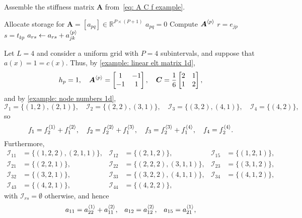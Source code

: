 \begin{algorithm}
\caption{Assemble the stiffness matrix $\boldsymbol{A}$
from~\eqref{eq: A C f example}.}
\label{alg: assemble A piecewise linear}
\begin{algorithmic}
\State Allocate storage for
$\boldsymbol{A}=[a_{pq}]\in\mathbb{R}^{P\times(P+1)}$
        \State $a_{pq}=0$
    \EndFor
\EndFor
{}
    \State Compute $\boldsymbol{A}^{\langle p\rangle}$
        \State $r=e_{jp}$
                \State $s=t_{kp}$
                \State $a_{rs}\gets a_{rs}+a^{\langle p\rangle}_{jk}$
            \EndFor
        \EndIf
    \EndFor
\EndFor
\end{algorithmic}
\end{algorithm}

\begin{example}\label{example: assemble A}
Let $L=4$ and consider a uniform grid with $P=4$ subintervals, and suppose 
that $a(x)=1=c(x)$.  Thus, by \cref{example: linear elt matrix 1d},
\[
h_p=1,\quad\boldsymbol{A}^{\langle p\rangle}=\begin{bmatrix}1&-1\\ -1&1\end{bmatrix},\quad
\boldsymbol{C}=\frac{1}{6}\begin{bmatrix}2&1\\ 1&2\end{bmatrix},
\]
and by \cref{example: node numbers 1d},
\[
\mathcal{I}_1=\{(1,2),(2,1)\},\quad
\mathcal{I}_2=\{(2,2),(3,1)\},\quad
\mathcal{I}_3=\{(3,2),(4,1)\},\quad
\mathcal{I}_4=\{(4,2)\},
\]
so
\[
f_1=f^{\langle1\rangle}_2+f^{\langle2\rangle}_1,\quad
f_2=f^{\langle2\rangle}_2+f^{\langle3\rangle}_1,\quad
f_3=f^{\langle3\rangle}_2+f^{\langle4\rangle}_1,\quad
f_4=f^{\langle4\rangle}_2.
\]
Furthermore,
\begin{align*}
\mathcal{I}_{11}&=\{(1,2,2),(2,1,1)\},&
\mathcal{I}_{12}&=\{(2,1,2)\},&
\mathcal{I}_{15}&=\{(1,2,1)\},\\
\mathcal{I}_{21}&=\{(2,2,1)\},&
\mathcal{I}_{22}&=\{(2,2,2),(3,1,1)\},&
\mathcal{I}_{23}&=\{(3,1,2)\},\\
\mathcal{I}_{32}&=\{(3,2,1)\},&
\mathcal{I}_{33}&=\{(3,2,2),(4,1,1)\},&
\mathcal{I}_{34}&=\{(4,1,2)\},\\
\mathcal{I}_{43}&=\{(4,2,1)\},&
\mathcal{I}_{44}&=\{(4,2,2)\},&&
\end{align*}
with $\mathcal{I}_{rs}=\emptyset$ otherwise, and hence
\begin{align*}
a_{11}&=a\brak{1}_{22}+a\brak{2}_{11},&
a_{12}&=a\brak{2}_{12},&
a_{15}&=a\brak{1}_{21},\\

\end{align*}
\end{example}
